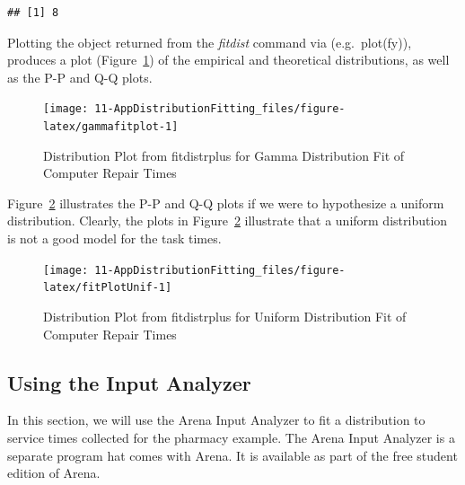 \documentclass[
]{book}
\newenvironment{Shaded}{\begin{snugshade}}{\end{snugshade}}
\newcommand{\CommentTok}[1]{\textcolor[rgb]{0.56,0.35,0.01}{\textit{#1}}}
\newcommand{\FunctionTok}[1]{\textcolor[rgb]{0.00,0.00,0.00}{#1}}
\newcommand{\NormalTok}[1]{#1}
\newcommand{\SpecialCharTok}[1]{\textcolor[rgb]{0.00,0.00,0.00}{#1}}
\theoremstyle{definition}
\theoremstyle{definition}
\theoremstyle{definition}
\theoremstyle{definition}
\theoremstyle{remark}
\begin{document}
\begin{Shaded}
\end{Shaded}

\begin{verbatim}
## [1] 8
\end{verbatim}

Plotting the object returned from the \emph{fitdist} command via (e.g.~plot(fy)), produces a plot
(Figure~\ref{fig:gammafitplot}) of the empirical and theoretical
distributions, as well as the P-P and Q-Q plots.

\begin{figure}

{\centering \texttt{[image: 11-AppDistributionFitting\_files/figure-latex/gammafitplot-1]} 

}

\caption{Distribution Plot from fitdistrplus for Gamma Distribution Fit of Computer Repair Times}\label{fig:gammafitplot}
\end{figure}

Figure~\ref{fig:fitPlotUnif} illustrates the P-P and Q-Q plots if we
were to hypothesize a uniform distribution. Clearly, the plots in
Figure~\ref{fig:fitPlotUnif} illustrate that a uniform distribution
is not a good model for the task times.

\begin{figure}

{\centering \texttt{[image: 11-AppDistributionFitting\_files/figure-latex/fitPlotUnif-1]} 

}

\caption{Distribution Plot from fitdistrplus for Uniform Distribution Fit of Computer Repair Times}\label{fig:fitPlotUnif}
\end{figure}

\hypertarget{app:idms2sb3}{%
\subsection{Using the Input Analyzer}\label{app:idms2sb3}}

In this section, we will use the Arena Input Analyzer to fit
a distribution to service times collected for the pharmacy example. The Arena Input Analyzer is a separate program hat comes with Arena. It is available as part of the free student edition of Arena.
\end{document}
